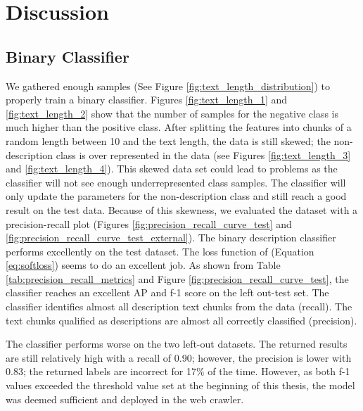 \documentclass[a4paper, 12pt, oneside]{book} %
\begin{document}
\newpage
\section{Discussion} \label{par:discussion}

\subsection{Binary Classifier}
We gathered enough samples (See Figure \ref{fig:text_length_distribution}) to properly train a binary classifier.
Figures \ref{fig:text_length_1} and \ref{fig:text_length_2} show that the number of samples for the negative class is much higher than the positive class. 
After splitting the features into chunks of a random length between 10 and the text length, the data is still skewed; the non-description class is over represented in the data (see Figures \ref{fig:text_length_3} and \ref{fig:text_length_4}). 
This skewed data set could lead to problems as the classifier will not see enough underrepresented class samples.
The classifier will only update the parameters for the non-description class and still reach a good result on the test data.
Because of this skewness, we evaluated the dataset with a precision-recall plot (Figures \ref{fig:precision_recall_curve_test} and \ref{fig:precision_recall_curve_test_external}).
The binary description classifier performs excellently on the test dataset. 
The loss function of \textcite{reed_training_2015} (Equation \ref{eq:softloss}) seems to do an excellent job.
As shown from Table \ref{tab:precision_recall_metrics} and Figure \ref{fig:precision_recall_curve_test}, the classifier reaches an excellent AP and f-1 score on the left out-test set.
The classifier identifies almost all description text chunks from the data (recall).
The text chunks qualified as descriptions are almost all correctly classified (precision).

The classifier performs worse on the two left-out datasets. 
The returned results are still relatively high with a recall of 0.90; however, the precision is lower with 0.83; the returned labels are incorrect for 17\% of the time.
However, as both f-1 values exceeded the threshold value set at the beginning of this thesis, the model was deemed sufficient and deployed in the web crawler. 
\end{document}
